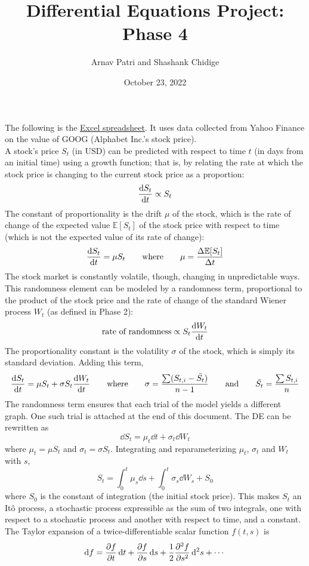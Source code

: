 \documentclass[12pt, A4]{article}
\title{Differential Equations Project: Phase 4}
\author{Arnav Patri and Shashank Chidige}
\date{October 23, 2022}
\newcommand{\Exp}{\mathbb{E}}
\begin{document}
	\maketitle
	\noindent
		The following is the \href{https://docs.google.com/spreadsheets/d/10UhPew6GsC5f6DCJjFd24MZSaZ1SWjiQvmOD6k-tmcE/edit}{\underline{Excel spreadsheet}}. It uses data collected from Yahoo Finance on the value of GOOG (Alphabet Inc.'s stock price). \\
		A stock's price \(S_t\) (in USD) can be predicted with respect to time \(t\) (in days from an initial time) using a growth function; that is, by relating the rate at which the stock price is changing to the current stock price as a proportion:
			\[\dv{S_t}{t} \propto S_t\]
			The constant of proportionality is the drift \(\mu\) of the stock, which is the rate of change of the expected value \(\Exp[S_t]\) of the stock price with respect to time (which is not the expected value of its rate of change):
			\[
				\dv{S_t}{t} = \mu S_t \qquad \text{where} \qquad
				\mu= \frac{\Delta \Exp[S_t]}{\Delta t}
			\]
			The stock market is constantly volatile, though, changing in unpredictable ways. This randomness element can be modeled by a randomness term, proportional to the product of the stock price and the rate of change of the standard Wiener process \(W_t\) (as defined in Phase 2):
			\[\text{rate of randomness} \propto S_t\dv{W_t}{t}\]
			The proportionality constant is the volatility \(\sigma\) of the stock, which is simply its standard deviation. Adding this term,
			\[
				\dv{S_t}{t} = \mu S_t + \sigma S_t\dv{W_t}{t} \qquad \text{where} \qquad
				\sigma = \frac{\sum (S_{t, i} - \bar{S_t})}{n - 1} \qquad \text{and} \qquad
				\bar{S_t} = \frac{\sum S_{t, i}}{n}
			\]
			The randomness term ensures that each trial of the model yields a different graph. One such trial is attached at the end of this document.
		The DE can be rewritten as
			\[\dd{S}_t = \mu_t\dd{t} + \sigma_t\dd{W_t}\]
			where \(\mu_t = \mu S_t\) and \(\sigma_t = \sigma S_t\). Integrating and reparameterizing \(\mu_t\), \(\sigma_t\) and \(W_t\) with \(s\),
			\[S_t = \int_0^t\mu_s\dd{s} + \int_0^t\sigma_s\dd{W}_s + S_0\]
			where \(S_0\) is the constant of integration (the initial stock price). This makes \(S_t\) an It\^o process, a stochastic process expressible as the sum of two integrals, one with respect to a stochastic process and another with respect to time, and a constant. \\
		The Taylor expansion of a twice-differentiable scalar function \(f(t, s)\) is
			\[\dd{f} = \pdv{f}{t}\dd{t} + \pdv{f}{s}\dd{s} + \frac{1}{2}\pdv[2]{f}{s}\dd[2]{s} + \cdots\]
\end{document}
